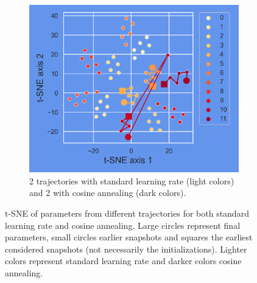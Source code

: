 \begin{figure}[H]
	\begin{subfigure}{.45\textwidth}
		\centering
		\includegraphics[width=.9\linewidth]{./figs/params_tSNE_2.png}  
		\caption{2 trajectories with standard learning rate (light colors) and 2 with cosine annealing (dark colors).}
		\label{fig:sub-second}
	\end{subfigure}
	\caption{t-SNE of parameters from different trajectories for both standard learning rate and cosine annealing. Large circles represent final parameters, small circles earlier snapshots and squares the earliest considered snapshots (not necessarily the initializations). Lighter colors represent standard learning rate and darker colors cosine annealing.}
	\label{fig:fig}
\end{figure}

